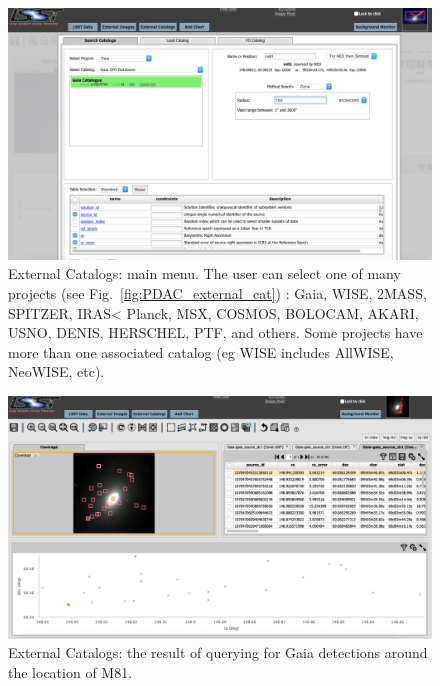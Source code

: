 \documentclass[DM,lsstdraft,toc,usenatbib]{lsstdoc}
\begin{document}
\begin{figure}
\includegraphics[width=\textwidth]{figs/external_catalogs_menu.png}
\caption{External Catalogs:  main menu. The user can select one of many projects (see Fig.~\ref{fig:PDAC_external_cat}) : Gaia, WISE, 2MASS, SPITZER, IRAS< Planck, MSX, COSMOS, BOLOCAM, AKARI, USNO, DENIS, HERSCHEL, PTF, and others. Some projects have more than one associated catalog (eg WISE includes AllWISE, NeoWISE, etc). }
\label{fig:ext_catalogs}
\end{figure}


\begin{figure}
\includegraphics[width=\textwidth]{figs/external_catalogs_m81.png}
\caption{External Catalogs:  the result of querying for Gaia detections around  the location of M81. }
\label{fig:ext_catalogs_m81}
\end{figure}
\end{document}
